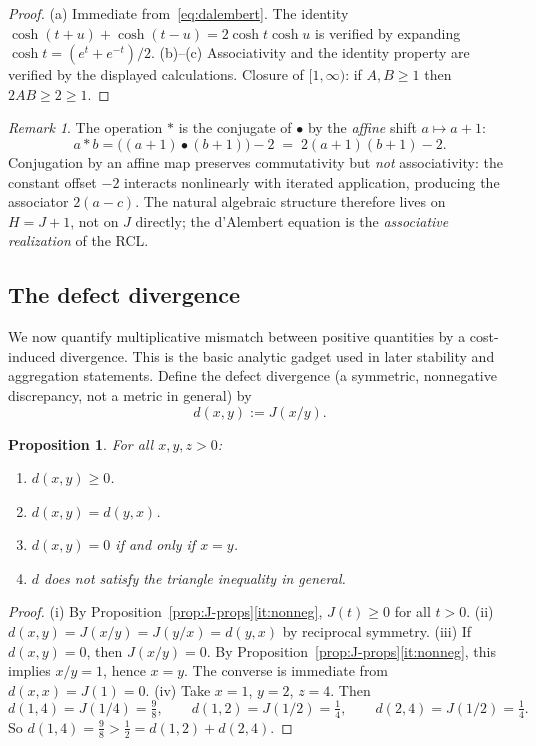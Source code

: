 \documentclass[11pt,reqno]{amsart}
\theoremstyle{plain}
\newtheorem{proposition}[theorem]{Proposition}
\theoremstyle{definition}
\theoremstyle{remark}
\newtheorem{remark}[theorem]{Remark} %
\newcommand{\Jcost}{J}
\newcommand{\1}{\mathbf{1}}
\begin{document}
\begin{proof}
(a) Immediate from~\eqref{eq:dalembert}. The identity
$\cosh(t{+}u)+\cosh(t{-}u)=2\cosh t\cosh u$ is verified by
expanding $\cosh t=(e^t+e^{-t})/2$. (b)--(c) Associativity and the identity property are verified
by the displayed calculations. Closure of $[1,\infty)$: if
$A,B\ge1$ then $2AB\ge2\ge1$.
\end{proof} 

\begin{remark}\label{rem:why-nonassoc}
The operation $\ast$ is the conjugate of $\bullet$ by the
\emph{affine} shift $a\mapsto a+1$:
\[ a\ast b = \bigl((a{+}1)\bullet(b{+}1)\bigr)-2 \;=\; 2(a{+}1)(b{+}1)-2.
\]
Conjugation by an affine map preserves commutativity but \emph{not}
associativity: the constant offset $-2$ interacts nonlinearly with
iterated application, producing the associator $2(a{-}c)$.
The natural algebraic structure therefore lives on $H=\Jcost+1$,
not on $\Jcost$ directly; the d'Alembert equation is the
\emph{associative realization} of the RCL.
\end{remark}

\subsection{The defect divergence}\label{ssec:metric}
We now quantify multiplicative mismatch between positive quantities by a cost-induced divergence. This is the basic analytic gadget used in later stability and aggregation statements.
Define the defect divergence (a symmetric, nonnegative discrepancy, not a metric in general) by
\begin{equation}\label{eq:defect-dist}
 d(x,y):=\Jcost(x/y).
\end{equation}

\begin{proposition}\label{prop:metric}
For all $x,y,z>0$:
\begin{enumerate}[nosep,label=\textup{(\roman*)}]
\item $d(x,y)\ge0$.
\item $d(x,y)=d(y,x)$.
\item $d(x,y)=0$ if and only if $x=y$.
\item $d$ does not satisfy the triangle inequality in general.
\end{enumerate}
\end{proposition}

\begin{proof}
(i) By Proposition~\ref{prop:J-props}\ref{it:nonneg}, $\Jcost(t)\ge 0$ for all $t>0$. (ii) $d(x,y)=\Jcost(x/y)=\Jcost(y/x)=d(y,x)$ by reciprocal symmetry. (iii) If $d(x,y)=0$, then $\Jcost(x/y)=0$.
By Proposition~\ref{prop:J-props}\ref{it:nonneg}, this implies $x/y=1$,
hence $x=y$. The converse is immediate from $d(x,x)=\Jcost(1)=0$. (iv) Take $x=1$, $y=2$, $z=4$. Then
\[ d(1,4)=\Jcost(1/4)=\tfrac{9}{8},\qquad d(1,2)=\Jcost(1/2)=\tfrac14,\qquad d(2,4)=\Jcost(1/2)=\tfrac14.
\]
So $d(1,4)=\tfrac98>\tfrac12=d(1,2)+d(2,4)$.
\end{proof} 
\end{document}
